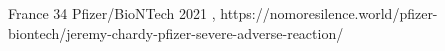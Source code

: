           {
            France
          }
          {
            34
          }
          {
            Pfizer/BioNTech
          }
          {
            2021
          }
          {
            ,
          }
          {
            https://nomoresilence.world/pfizer-biontech/jeremy-chardy-pfizer-severe-adverse-reaction/
          }

